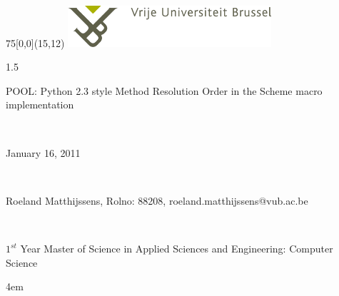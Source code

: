 \documentclass[10pt,a4paper]{scrartcl}
\begin{document}
\begin{textblock}{75}[0,0](15,12)
\includegraphics[width=75.5mm]{VUB_logo_kleur.png}
\end{textblock}
\begin{center}
\begin{spacing}{1.5}
\begin{large}
\end{large}
\begin{LARGE}
POOL: Python 2.3 style Method Resolution Order in the Scheme macro implementation
\end{LARGE}
\\
\begin{large}
January 16, 2011
\end{large}
\\
\begin{large}
Roeland Matthijssens, Rolno: 88208, roeland.matthijssens@vub.ac.be
\end{large}
\\
\begin{normalsize}
$ 1^{st}$ Year Master of Science in Applied Sciences and Engineering: Computer Science
\end{normalsize}
\end{spacing}
\end{center}
\begingroup
\leftskip4em
\rightskip\leftskip
\end{document}

